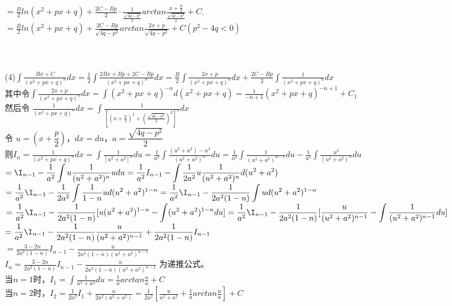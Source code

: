 \documentclass[UTF8]{ctexart}
\begin{document}
\\ $=\displaystyle{\frac{B}{2}ln(x^2+px+q)+\frac{2C-Bp}{2}\cdot \frac{1}{\frac{\sqrt{4q-p^2}}{2}}arctan\frac{x+\frac{p}{2}}{\frac{\sqrt{4q-p^2}}{2}}+C}$.
\\ $=\displaystyle{\frac{B}{2}ln(x^2+px+q)+\frac{2C-Bp}{\sqrt{4q-p^2}}arctan\frac{2x+p}{\sqrt{4q-p^2}}+C(p^2-4q<0)}$
\\ \\ \\ \\(4)$\displaystyle{\int \frac{Bx+C}{(x^2+px+q)^n}dx=\frac{1}{2}\int \frac{2Bx+Bp+2C-Bp}{(x^2+px+q)^n}dx=\frac{B}{2}\int \frac{2x+p}{(x^2+px+q)^n}dx+\frac{2C-Bp}{2}\int \frac{1}{(x^2+px+q)^n}dx}$
\\ 其中令$\displaystyle{\int \frac{2x+p}{(x^2+px+q)^n}dx=\int (x^2+px+q)^{-n}d(x^2+px+q)=\frac{1}{-n+1}(x^2+px+q)^{-n+1}+C_1}$
\\ 然后令 $\displaystyle{\frac{1}{(x^2+px+q)^n}dx=\int \frac{1}{[(x+\frac{p}{2})^2+(\frac{\sqrt{4q-p^2}}{2})^2]^n}dx}$
\\ 令 $u=(x+\dfrac{p}{2})$，$dx=du$，$a=\dfrac{\sqrt{4q-p^2}}{2}$
\\ 则$\displaystyle{I_n=\frac{1}{(x^2+px+q)^n}dx=\int \frac{1}{[u^2+a^2]^n}du=\frac{1}{a^2}\int \frac{(u^2+a^2)-u^2} {(u^2+a^2)^n}du=\frac{1}{a^2}\int \frac{1}{(u^2+a^2)^{n-1}}du-\frac{1}{a^2}\int \frac{u^2}{(u^2+a^2)^n}du}$
\\ $\displaystyle{=\I_{n-1}-\frac{1}{a^2}\int u\frac{1}{(u^2+a^2)^n}udu=\frac{1}{a^2}I_{n-1}-\int \frac{1}{2a^2}u\frac{1}{(u^2+a^2)^n}d(u^2+a^2)}$
\\ $\displaystyle{=\frac{1}{a^2}\I_{n-1}-\frac{1}{2a^2}\int \frac{1}{1-n}ud(u^2+a^2)^{1-n}= \frac{1}{a^2}\I_{n-1}-\frac{1}{2a^2(1-n)}\int ud(u^2+a^2)^{1-n}}$
\\ $\displaystyle{=\frac{1}{a^2}\I_{n-1}-\frac{1}{2a^2(1-n)}[u(u^2+a^2)^{1-n}-\int (u^2+a^2)^{1-n}du]=\frac{1}{a^2}\I_{n-1}-\frac{1}{2a^2(1-n)}[\frac{u}{(u^2+a^2)^{n-1}}-\int \frac{1}{(u^2+a^2)^{n-1}}du]}$
\\ $\displaystyle{=\frac{1}{a^2}\I_{n-1}-\frac{1}{2a^2(1-n)}\frac{u}{(u^2+a^2)^{n-1}}+\frac{1}{2a^2(1-n)}I_{n-1}}$
\\ $\displaystyle{=\frac{3-2n}{2a^2(1-n)}I_{n-1}-\frac{u}{2a^2(1-n)(u^2+a^2)^{n-1}}}$
\\ $\displaystyle{I_n=\frac{3-2n}{2a^2(1-n)}I_{n-1}-\frac{u}{2a^2(1-n)(u^2+a^2)^{n-1}}}$ 为递推公式。
\\ 当$n=1$时，$\displaystyle{I_1=\int \frac{1}{u^2+a^2}du=\frac{1}{a}arctan\frac{u}{a}+C}$
\\当$n=2$时，$\displaystyle{I_2=\frac{1}{2a^2}I_1+\frac{u}{2a^2(u^2+a^2)}=\frac{1}{2a^2}[\frac{u}{u^2+a^2}+\frac{1}{a}arctan\frac{u}{a}]+C}$
\end{document}
